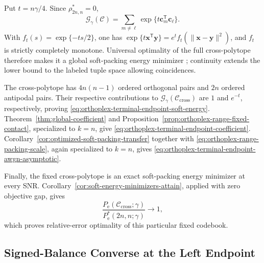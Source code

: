 \documentclass[12pt,draftclsnofoot,onecolumn]{IEEEtran}
\newcommand{\cC}{\mathcal{C}}
\newcommand{\cG}{\mathcal{G}}
\newcommand{\Pe}{P_{\mathrm e}}
\newcommand{\bc}{\bm c}
\newcommand{\bx}{\bm x}
\newcommand{\by}{\bm y}
\theoremstyle{definition}
\begin{document}
\begin{IEEEproof}
Put \(t=n\gamma/4\).  Since \(\rho^{\ast}_{2n,n}=0\),
\begin{equation*}
  \cG_\gamma(\cC)
  =\sum_{m\ne\ell}\exp\{t\bc_m^{\mathsf T}\bc_\ell\}.
\end{equation*}
With \(f_t(s)=\exp\{-ts/2\}\), one has
\(\exp\{t\bx^{\mathsf T}\by\}=e^t f_t(\|\bx-\by\|^2)\), and
\(f_t\) is strictly completely monotone.  Universal optimality of the
full cross-polytope therefore makes it a global soft-packing energy minimizer
\cite[Thm.~1.2 and Table~1]{CohnKumar2007}; continuity extends the
lower bound to the labeled tuple space allowing coincidences.

The cross-polytope has \(4n(n-1)\) ordered orthogonal pairs and \(2n\)
ordered antipodal pairs.  Their respective contributions to
\(\cG_\gamma(\cC_{\mathrm{cross}})\) are \(1\) and \(e^{-t}\),
respectively, proving
\eqref{eq:orthoplex-terminal-endpoint-soft-energy}.
Theorem~\ref{thm:global-coefficient} and
Proposition~\ref{prop:orthoplex-range-fixed-contact}, specialized to
\(k=n\), give \eqref{eq:orthoplex-terminal-endpoint-coefficient}.
Corollary~\ref{cor:optimized-soft-packing-transfer} together with
\eqref{eq:orthoplex-range-packing-scale}, again specialized to \(k=n\),
gives \eqref{eq:orthoplex-terminal-endpoint-awgn-asymptotic}.

Finally, the fixed cross-polytope is an exact soft-packing energy minimizer at
every SNR.  Corollary~\ref{cor:soft-energy-minimizers-attain}, applied
with zero objective gap, gives
\begin{equation*}
  \frac{\Pe(\cC_{\mathrm{cross}};\gamma)}
  {\Pe^{\ast}(2n,n;\gamma)}\longrightarrow1,
\end{equation*}
which proves relative-error optimality of this particular fixed
codebook.
\end{IEEEproof}

\subsection{Signed-Balance Converse at the Left Endpoint}
\end{document}
